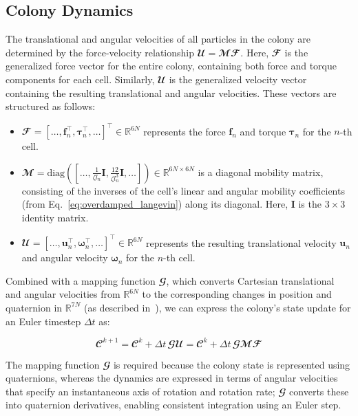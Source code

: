 \documentclass[conference]{IEEEtran}
\begin{document}
\subsection{Colony Dynamics}

The translational and angular velocities of all particles in the colony are determined by the force-velocity relationship $\mathbfcal{U} = \mathbfcal{M} \mathbfcal{F}$. Here, $\mathbfcal{F}$ is the generalized force vector for the entire colony, containing both force and torque components for each cell. Similarly, $\mathbfcal{U}$ is the generalized velocity vector containing the resulting translational and angular velocities. These vectors are structured as follows:

\begin{itemize}
    \item
          $\mathbfcal{F} = [\dots, \mathbf{f}_n^\top, \boldsymbol{\tau}_n^\top, \dots]^\top \in \mathbb{R}^{6N}$ represents the force $\mathbf{f}_n$ and torque $\boldsymbol{\tau}_n$ for the $n$-th cell.
    \item
          $\mathbfcal{M} = \text{diag}([\dots, \frac{1}{\zeta l_n}\mathbf{I}, \frac{12}{\zeta l_n^3}\mathbf{I}, \dots]) \in \mathbb{R}^{6N \times 6N}$ is a diagonal mobility matrix, consisting of the inverses of the cell's linear and angular mobility coefficients (from Eq.~\ref{eq:overdamped_langevin}) along its diagonal. Here, $\mathbf{I}$ is the $3 \times 3$ identity matrix.
    \item
          $\mathbfcal{U} = [\dots, \mathbf{u}_n^\top, \boldsymbol{\omega}_n^\top, \dots]^\top \in \mathbb{R}^{6N}$ represents the resulting translational velocity $\mathbf{u}_n$ and angular velocity $\boldsymbol{\omega}_n$ for the $n$-th cell.
\end{itemize}


Combined with a mapping function $\mathbfcal{G}$, which converts Cartesian translational and angular velocities from $\mathbb{R}^{6N}$ to the corresponding changes in position and quaternion in $\mathbb{R}^{7N}$ (as described in~\cite{Weady2024SM,Yan2022,Tasora2008}), we can express the colony's state update for an Euler timestep $\Delta t$ as:

\begin{equation} \label{eq:colony_update}
    \mathbfcal{C}^{k+1} = \mathbfcal{C}^k + \Delta t \, \mathbfcal{G} \mathbfcal{U} = \mathbfcal{C}^k + \Delta t \, \mathbfcal{G} \mathbfcal{M} \mathbfcal{F}
\end{equation}

The mapping function $\mathbfcal{G}$ is required because the colony state is represented using quaternions, whereas the dynamics are expressed in terms of angular velocities that specify an instantaneous axis of rotation and rotation rate; $\mathbfcal{G}$ converts these into quaternion derivatives, enabling consistent integration using an Euler step\cite{Weady2024SM, Tasora2008}.
\end{document}
